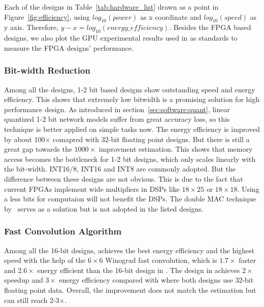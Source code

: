 Each of the designs in Table~\ref{tab:hardware_list} drawn as a point in Figure~\ref{fig:efficiency}, using $log_{10}(power)$ as x coordinate and $log_{10}(speed)$ as y axis. Therefore, $y-x=log_{10}(energy\_efficiency)$. Besides the FPGA based designs, we also plot the GPU experimental results used in \cite{guo2017angel, han2017ese} as standards to measure the FPGA designs' performance.

\subsubsection*{\textbf{Bit-width Reduction}} Among all the designs, 1-2 bit based designs show outstanding speed and energy efficiency. This shows that extremely low bitwidth is a promising solution for high performance design. As introduced in section~\ref{sec:software:quant}, linear quantized 1-2 bit network models suffer from great accuracy loss, so this technique is better applied on simple tasks now. The energy efficiency is improved by about 100$\times$ comapred with 32-bit floating point designs. But there is still a great gap towards the $1000\times$ improvment estimation. This shows that memory access becomes the bottleneck for 1-2 bit designs, which only scales linearly with the bit-width. INT16/8, INT16 and INT8 are commonly adopted. But the difference between these designs are not obvious. This is due to the fact that current FPGAs implement wide multipliers in DSPs like $18\times 25$ or $18\times 18$. Using a less bits for computaion will not benefit the DSPs. The double MAC technique by~\cite{nguyen2017double} serves as a solution but is not adopted in the listed designs.

\subsubsection*{\textbf{Fast Convolution Algorithm}} Among all the 16-bit designs, \cite{lu2017evaluating} achieves the best energy efficiency and the highest speed with the help of the $6\times 6$ Winograd fast convolution, which is $1.7\times$ faster and $2.6\times$ energy efficient than the 16-bit design in \cite{zhang2017improving}. The design in \cite{zhang2017frequency} achieves $2\times$ speedup and $3\times$ energy efficiency compared with \cite{zhang2015optimizing} where both designs use 32-bit floating point data. Overall, the improvement does not match the estimation but can still reach 2-3$\times$.


